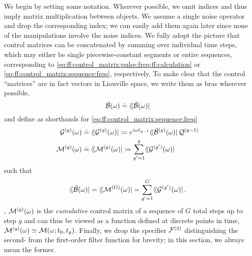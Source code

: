 We begin by setting some notation.
Wherever possible, we omit indices and thus imply matrix multiplication between objects.
We assume a single noise operator and drop the corresponding index; we can easily add them again later since none of the manipulations involve the noise indices.
We fully adopt the picture that control matrices can be concatenated by summing over individual time steps, which may either be single piecewise-constant segments or entire sequences, corresponding to \cref{eq:ff:control_matrix:pulse:freq:ff:calculation} or \cref{eq:ff:control_matrix:sequence:freq}, respectively.
To make clear that the control \enquote{matrices} are in fact vectors in Liouville space, we write them as bras wherever possible,
\begin{equation}
    \ctrlmat(\omega) \doteq \dbra*{\ctrlmat(\omega)}
\end{equation}
and define as shorthands for \cref{eq:ff:control_matrix:sequence:freq}
\begin{align}
    \mc{G}\gth{g}(\omega) & \doteq \dbra*{\mc{G}\gth{g}(\omega)}
                            \coloneqq \e^{\i\omega t_{g-1}}\dbra*{\ctrlmat\gth{g}(\omega)}\liouvQ\gth{g-1} \label{eq:app:ff:ctrlmat_step} \\
    \mc{M}\gth{g}(\omega) & \doteq \dbra*{\mc{M}\gth{g}(\omega)}
                            \coloneqq \sum_{g^{\prime}=1}^{g}\dbra*{\mc{G}\gth{g^{\prime}}(\omega)} \label{eq:app:ff:ctrlmat_cumulative}
\end{align}
such that
\begin{equation}
    \dbra*{\ctrlmat(\omega)} = \dbra*{\mc{M}\gth{G}(\omega)} = \sum_{g^{\prime}=1}^G\dbra*{\mc{G}\gth{g^{\prime}}(\omega)}.
\end{equation}
\Ie, $\mathcal{M}^{(g)}(\omega)$ is the \emph{cumulative} control matrix of a sequence of $G$ total steps up to step $g$ and can thus be viewed as a function defined at discrete points in time, $\mathcal{M}^{(g)}(\omega)\simeq \mathcal{M}(\omega;t_0,t_g)$.
Finally, we drop the specifier $\mathcal{F}^{(2)}$ distinguishing the second- from the first-order filter function for brevity; in this section, we always mean the former.

